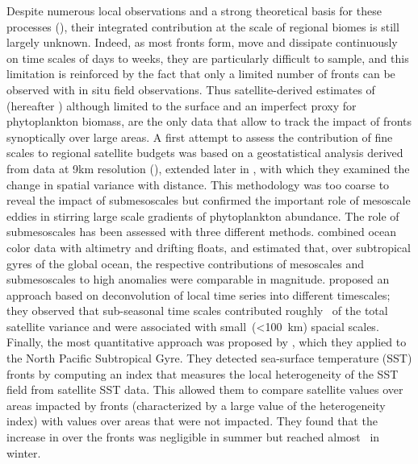 Despite numerous local observations and a strong theoretical basis for these processes (\cite[e.g.\ recent studies by][]{marrec_2018, little_2018, verneil_2019, ruiz_2019, uchida_2020, kessouri_2020, tzortzis_2021}), their integrated contribution at the scale of regional biomes is still largely unknown.
Indeed, as most fronts form, move and dissipate continuously on time scales of days to weeks, they are particularly difficult to sample, and this limitation is reinforced by the fact that only a limited number of fronts can be observed with in situ field observations.
Thus satellite-derived estimates of  (hereafter ) although limited to the surface and an imperfect proxy for phytoplankton biomass, are the only data that allow to track the impact of fronts synoptically over large areas.
A first attempt to assess the contribution of fine scales to regional satellite  budgets was based on a geostatistical analysis derived from data at 9km resolution (\cite{doney_2003}), extended later in \textcite{glover_2018}, with which they examined the change in spatial variance with distance.
This methodology was too coarse to reveal the impact of submesoscales but confirmed the important role of mesoscale eddies in stirring large scale gradients of phytoplankton abundance.
The role of submesoscales has been assessed with three different methods.
\textcite{guo_2019} combined ocean color data with altimetry and drifting floats, and estimated that, over subtropical gyres of the global ocean, the respective contributions of mesoscales and submesoscales to high  anomalies were comparable in magnitude.
\textcite{keerthi_2022} proposed an approach based on deconvolution of local  time series into different timescales; they observed that sub-seasonal time scales contributed roughly~ of the total satellite  variance and were associated with small~(\qty{<100}{\km}) spacial scales.
Finally, the most quantitative approach was proposed by \textcite{liu_2016}, which they applied to the North Pacific Subtropical Gyre.
They detected sea-surface temperature (SST) fronts by computing an index that measures the local heterogeneity of the SST field from satellite SST data.
This allowed them to compare satellite  values over areas impacted by fronts (characterized by a large value of the heterogeneity index) with values over areas that were not impacted.
They found that the increase in  over the fronts was negligible in summer but reached almost~ in winter.

